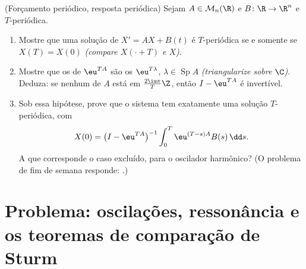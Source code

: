 \begin{exercise}[$\star\star\star$]\label{exo:b2:diffeq:12}
(Forçamento periódico, resposta periódica) Sejam $A \in
\mathcal{M}_n(\R)$ e $B \colon \R \to \R^n$  e
$T$-periódica.
\begin{enumerate}
  \item Mostre que uma solução de $X' = AX + B(t)$ é
        $T$-periódica se e somente se $X(T) = X(0)$
        \emph{(compare $X(\cdot + T)$ e $X$)}.
  \item Mostre que os  de $\eu^{TA}$ são os
        $\eu^{T\lambda}$, $\lambda \in \operatorname{Sp}A$
        \emph{(triangularize sobre $\C$)}. Deduza: se nenhum
         de $A$ está em $\frac{2\iu\pi}{T}\Z$, então
        $I - \eu^{TA}$ é invertível.
  \item Sob essa hipótese, prove que o sistema tem
        exatamente uma solução $T$-periódica, com
        \[
        X(0) = \bigl(I - \eu^{TA}\bigr)^{-1}
        \int_0^{T}\eu^{(T-s)A}B(s)\,\dd s .
        \]
        A que corresponde o caso excluído, para o
        oscilador harmônico? (O problema de fim de semana responde:
        .)
\end{enumerate}
\end{exercise}

\section{Problema: oscilações, ressonância e os teoremas de
comparação de Sturm}


